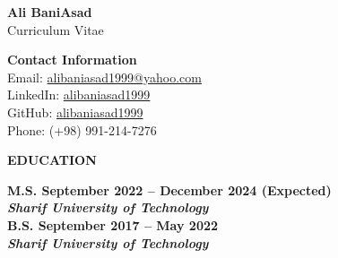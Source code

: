 \documentclass[12pt]{article}
\begin{document}

\begin{center}
	{\Large \bfseries Ali BaniAsad} \\
	\vspace{4pt}
	{\large Curriculum Vitae}
\end{center}

	{\noindent \bf Contact Information} \\
	\href{mailto:alibaniasad1999@yahoo.com}{\faEnvelope} Email: \href{mailto:alibaniasad1999@yahoo.com}{alibaniasad1999@yahoo.com}   \\
	\href{https://linkedin.com/in/alibaniasad1999/}{\textcolor{blue}{\faLinkedin}}
	LinkedIn: \href{https://linkedin.com/in/alibaniasad1999/}{alibaniasad1999} \\
	\href{https://github.com/alibaniasad1999}{\faGithub}
	GitHub: \href{https://github.com/alibaniasad1999}{alibaniasad1999}\\
	\faPhone \hspace{0pt}
	Phone: (+98) 991-214-7276

\vspace{-4pt}
\begin{center} %
	{\noindent \bfseries EDUCATION}
\end{center} %

\vspace{8pt} %

\noindent
 \bf{M.S.}
  \hfill September 2022 -- December 2024 (Expected) \\
\noindent \textit{Sharif University of Technology} \\

\noindent
 \bf{B.S.}
 \hfill September 2017 -- May 2022 \\
\noindent \textit{Sharif University of Technology} \\


\end{document}

